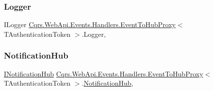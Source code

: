 \subsubsection{\texorpdfstring{Logger}{Logger}}
{\footnotesize\ttfamily I\+Logger \hyperlink{classCqrs_1_1WebApi_1_1Events_1_1Handlers_1_1EventToHubProxy}{Cqrs.\+Web\+Api.\+Events.\+Handlers.\+Event\+To\+Hub\+Proxy}$<$ T\+Authentication\+Token $>$.Logger\hspace{0.3cm}{\ttfamily [get]}, {\ttfamily [protected]}}

\mbox{\label{classCqrs_1_1WebApi_1_1Events_1_1Handlers_1_1EventToHubProxy_a3e27dc5fb1315bc8200487fbf9b3b47f}} 
\subsubsection{\texorpdfstring{Notification\+Hub}{NotificationHub}}
{\footnotesize\ttfamily \hyperlink{interfaceCqrs_1_1WebApi_1_1SignalR_1_1Hubs_1_1INotificationHub}{I\+Notification\+Hub} \hyperlink{classCqrs_1_1WebApi_1_1Events_1_1Handlers_1_1EventToHubProxy}{Cqrs.\+Web\+Api.\+Events.\+Handlers.\+Event\+To\+Hub\+Proxy}$<$ T\+Authentication\+Token $>$.\hyperlink{classCqrs_1_1WebApi_1_1SignalR_1_1Hubs_1_1NotificationHub}{Notification\+Hub}\hspace{0.3cm}{\ttfamily [get]}, {\ttfamily [protected]}}

